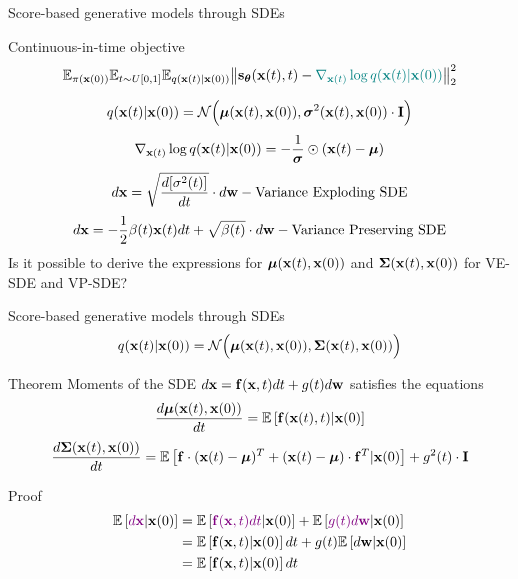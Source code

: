 \begin{frame}{Score-based generative models through SDEs}
	\vspace{-0.3cm}
	\begin{block}{Continuous-in-time objective}
		\vspace{-0.5cm}
		\[
			\mathbb{E}_{\pi(\mathbf{x}(0))} \mathbb{E}_{t \sim U[0, 1]} \mathbb{E}_{q(\mathbf{x}(t) | \mathbf{x}(0))}\bigl\| \mathbf{s}_{\boldsymbol{\theta}}(\mathbf{x}(t), t) - {\color{teal}\nabla_{\mathbf{x}(t)} \log q(\mathbf{x}(t) | \mathbf{x}(0))} \bigr\|^2_2 
		\]
		\vspace{-0.7cm}
	\end{block}
	\[
		q(\mathbf{x}(t) | \mathbf{x}(0)) = \mathcal{N}\Bigl(\boldsymbol{\mu}(\mathbf{x}(t), \mathbf{x}(0)), \boldsymbol{\sigma}^2(\mathbf{x}(t), \mathbf{x}(0)) \cdot \mathbf{I} \Bigr)
	\]
	\[
		\nabla_{\mathbf{x}(t)} \log q(\mathbf{x}(t) | \mathbf{x}(0)) = - \frac{1}{\boldsymbol{\sigma}} \odot (\mathbf{x}(t) - \boldsymbol{\mu})
	\]
	\[
		d \mathbf{x} = \sqrt{\frac{ d [\sigma^2(t)]}{dt}} \cdot d \mathbf{w} - \text{Variance Exploding SDE}
	\]
	\vspace{-0.3cm}
	\[
		d \mathbf{x} = - \frac{1}{2} \beta(t) \mathbf{x}(t) dt + \sqrt{\beta(t)} \cdot d \mathbf{w} - \text{Variance Preserving SDE}
	\]
	Is it possible to derive the expressions for $\boldsymbol{\mu}(\mathbf{x}(t), \mathbf{x}(0))$ and $\boldsymbol{\Sigma}(\mathbf{x}(t), \mathbf{x}(0))$ for VE-SDE and VP-SDE?
\end{frame}
\begin{frame}{Score-based generative models through SDEs}
	\[
		q(\mathbf{x}(t) | \mathbf{x}(0)) = \mathcal{N}\Bigl(\boldsymbol{\mu}(\mathbf{x}(t), \mathbf{x}(0)), \boldsymbol{\Sigma}(\mathbf{x}(t), \mathbf{x}(0))\Bigr)
	\]
	\vspace{-0.3cm}
	\begin{block}{Theorem}
		Moments of the SDE $d\mathbf{x} = \mathbf{f}(\mathbf{x}, t) dt + g(t) d \mathbf{w}$ satisfies the equations
		\[
			\frac{d \boldsymbol{\mu}(\mathbf{x}(t), \mathbf{x}(0))}{dt} = \mathbb{E} \left[ \mathbf{f}(\mathbf{x}(t), t) | \mathbf{x}(0)\right]
		\]
		\[
			\frac{d \boldsymbol{\Sigma}(\mathbf{x}(t), \mathbf{x}(0))}{dt} = \mathbb{E} \left[ \mathbf{f} \cdot (\mathbf{x}(t) - \boldsymbol{\mu})^T + (\mathbf{x}(t) - \boldsymbol{\mu}) \cdot \mathbf{f}^T | \mathbf{x}(0)\right] + g^2(t) \cdot \mathbf{I}
		\]
	\end{block}
	\begin{block}{Proof}
		\vspace{-0.7cm}
		\begin{align*}
			\mathbb{E}\left[{\color{violet}d\mathbf{x}} | \mathbf{x}(0) \right] &= \mathbb{E}\left[{\color{violet}\mathbf{f}(\mathbf{x}, t) dt} | \mathbf{x}(0) \right] + \mathbb{E}\left[{\color{violet}g(t) d \mathbf{w}} | \mathbf{x}(0) \right] \\
			&= \mathbb{E}\left[\mathbf{f}(\mathbf{x}, t) | \mathbf{x}(0) \right] dt + g(t) \mathbb{E}\left[d \mathbf{w} | \mathbf{x}(0) \right] \\
			&= \mathbb{E}\left[\mathbf{f}(\mathbf{x}, t) | \mathbf{x}(0) \right] dt
		\end{align*}
	\end{block}
\end{frame}
